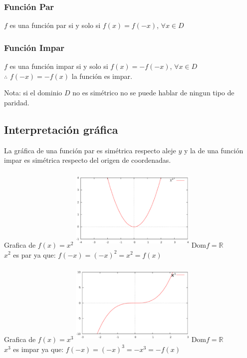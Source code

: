 \subsubsection{Función Par}
\begin{center}
$f$ es una función par si y solo si 
$f(x)=f(-x)$, $ \forall x \in D$
\end{center}
\subsubsection{Función Impar}
\begin{center}
$f$ es una función impar si y solo si 
$f(x)=-f(-x)$, $ \forall x \in D$\\$\therefore$ $f(-x)=-f(x)$ la función es impar.
\end{center}
Nota: si el dominio $D$ no es simétrico no se puede hablar de ningun tipo de paridad.
\subsection{Interpretación gráfica} 
La gráfica de una función par es simétrica respecto aleje $y$ y la de una función impar es simétrica respecto del origen de coordenadas.\\

\hfill
\begin{minipage}{.45\textwidth}
\begin{center}
Grafica de $f(x)=x^{2}$
\includegraphics[height=4cm,width=6cm]{fxx.eps} 
Dom$f= \mathbb{R}$\\
$x^{2}$ es par ya que: $f(-x)=(-x)^{2}=x^{2}=f(x)$ 
\end{center}
\end{minipage}
\hfill
\begin{minipage}{.45\textwidth}
\begin{center}
Grafica de $f(x)=x^{3}$
\includegraphics[height=4cm,width=6cm]{fxxx.eps} 
Dom$f= \mathbb{R}$ \\
$x^{3}$ es impar ya que: $f(-x)=(-x)^{3}=-x^{3}=-f(x)$ 
\end{center}
\end{minipage}
\hfill
\\\\

